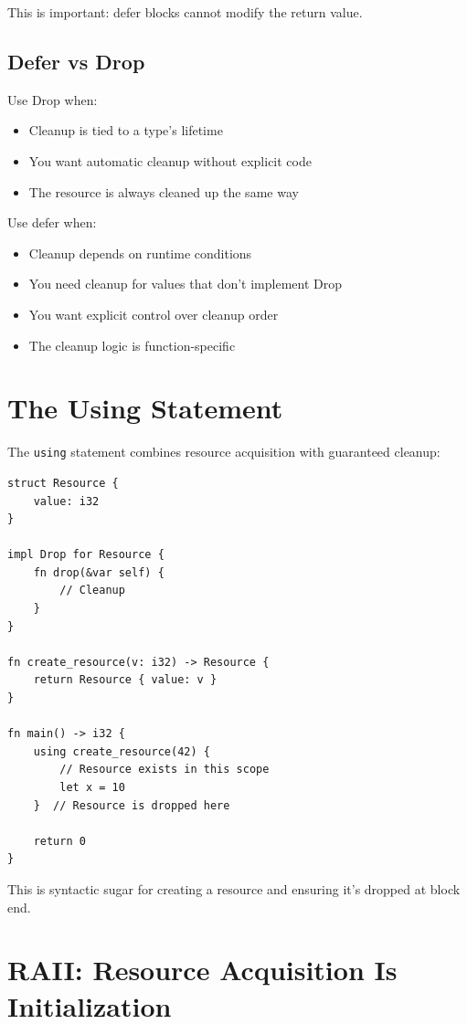 This is important: defer blocks cannot modify the return value.

\subsection{Defer vs Drop}

Use Drop when:
\begin{itemize}
    \item Cleanup is tied to a type's lifetime
    \item You want automatic cleanup without explicit code
    \item The resource is always cleaned up the same way
\end{itemize}

Use defer when:
\begin{itemize}
    \item Cleanup depends on runtime conditions
    \item You need cleanup for values that don't implement Drop
    \item You want explicit control over cleanup order
    \item The cleanup logic is function-specific
\end{itemize}

\section{The Using Statement}

The \texttt{using} statement combines resource acquisition with guaranteed cleanup:

\begin{lstlisting}
struct Resource {
    value: i32
}

impl Drop for Resource {
    fn drop(&var self) {
        // Cleanup
    }
}

fn create_resource(v: i32) -> Resource {
    return Resource { value: v }
}

fn main() -> i32 {
    using create_resource(42) {
        // Resource exists in this scope
        let x = 10
    }  // Resource is dropped here

    return 0
}
\end{lstlisting}

This is syntactic sugar for creating a resource and ensuring it's dropped at block end.

\section{RAII: Resource Acquisition Is Initialization}
\label{sec:raii}

